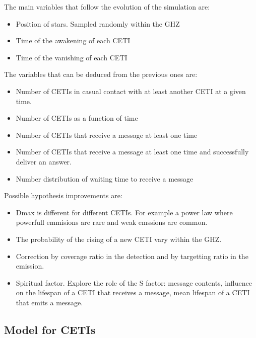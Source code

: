 \documentclass[useAMS,usenatbib]{mnras}
\begin{document}
The main variables that follow the evolution of the simulation are:

\begin{itemize}
   \item Position of stars.  Sampled randomly within the GHZ
   \item Time of the awakening of each CETI
   \item Time of the vanishing of each CETI
\end{itemize}

The variables that can be deduced from the previous ones are:

\begin{itemize}
   \item Number of CETIs in casual contact with at least another CETI
      at a given time.
   \item Number of CETIs as a function of time
   \item Number of CETIs that receive a message at least one time
   \item Number of CETIs that receive a message at least one time and
      successfully deliver an answer.
   \item Number distribution of waiting time to receive a message
\end{itemize}




Possible hypothesis improvements are:

\begin{itemize}
   \item Dmax is different for different CETIs.  For example a power
      law where powerfull emmisions are rare and weak emssions are
      common.
   \item The probability of the rising of a new CETI vary within the
      GHZ.
   \item Correction by coverage ratio in the detection and by
      targetting ratio in the emission.
   \item Spiritual factor.  Explore the role of the S factor: message
      contents, influence on the lifespan of a CETI that receives a
      message, mean lifespan of a CETI that emits a message.
\end{itemize}


\subsection{Model for CETIs}
\end{document}
